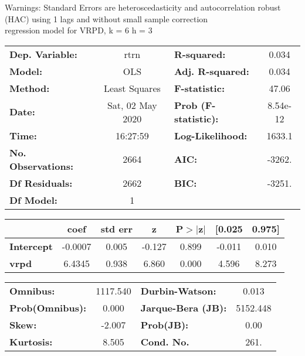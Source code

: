 Warnings: \newline
 [1] Standard Errors are heteroscedasticity and autocorrelation robust (HAC) using 1 lags and without small sample correction\\ 

regression model for VRPD, k = 6 h = 3\begin{center}
\begin{tabular}{lclc}
\toprule
\textbf{Dep. Variable:}    &       rtrn       & \textbf{  R-squared:         } &     0.034   \\
\textbf{Model:}            &       OLS        & \textbf{  Adj. R-squared:    } &     0.034   \\
\textbf{Method:}           &  Least Squares   & \textbf{  F-statistic:       } &     47.06   \\
\textbf{Date:}             & Sat, 02 May 2020 & \textbf{  Prob (F-statistic):} &  8.54e-12   \\
\textbf{Time:}             &     16:27:59     & \textbf{  Log-Likelihood:    } &    1633.1   \\
\textbf{No. Observations:} &        2664      & \textbf{  AIC:               } &    -3262.   \\
\textbf{Df Residuals:}     &        2662      & \textbf{  BIC:               } &    -3251.   \\
\textbf{Df Model:}         &           1      & \textbf{                     } &             \\
\bottomrule
\end{tabular}
\begin{tabular}{lcccccc}
                   & \textbf{coef} & \textbf{std err} & \textbf{z} & \textbf{P$> |$z$|$} & \textbf{[0.025} & \textbf{0.975]}  \\
\midrule
\textbf{Intercept} &      -0.0007  &        0.005     &    -0.127  &         0.899        &       -0.011    &        0.010     \\
\textbf{vrpd}      &       6.4345  &        0.938     &     6.860  &         0.000        &        4.596    &        8.273     \\
\bottomrule
\end{tabular}
\begin{tabular}{lclc}
\textbf{Omnibus:}       & 1117.540 & \textbf{  Durbin-Watson:     } &    0.013  \\
\textbf{Prob(Omnibus):} &   0.000  & \textbf{  Jarque-Bera (JB):  } & 5152.448  \\
\textbf{Skew:}          &  -2.007  & \textbf{  Prob(JB):          } &     0.00  \\
\textbf{Kurtosis:}      &   8.505  & \textbf{  Cond. No.          } &     261.  \\
\bottomrule
\end{tabular}
\end{center}

